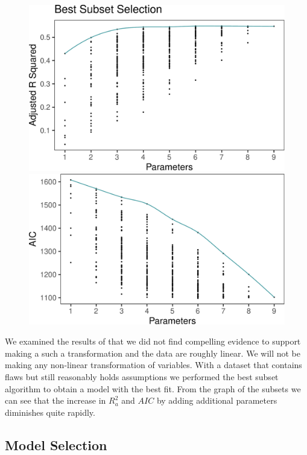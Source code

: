 \documentclass[
  english,
  man,floatsintext]{apa6}
\begin{document}
\begin{figure}
\includegraphics[width=0.5\linewidth]{paper_files/figure-latex/unnamed-chunk-3-1} \includegraphics[width=0.5\linewidth]{paper_files/figure-latex/unnamed-chunk-3-2} \caption{ }\label{fig:unnamed-chunk-3}
\end{figure}

We examined the results of that we did not find compelling evidence to support making a such a transformation and the data are roughly linear. We will not be making any non-linear transformation of variables. With a dataset that contains flaws but still reasonably holds assumptions we performed the best subset algorithm to obtain a model with the best fit. From the graph of the subsets we can see that the increase in \(R^{2}_a\) and \(AIC\) by adding additional parameters diminishes quite rapidly.

\hypertarget{model-selection}{%
\subsection{Model Selection}\label{model-selection}}
\end{document}
